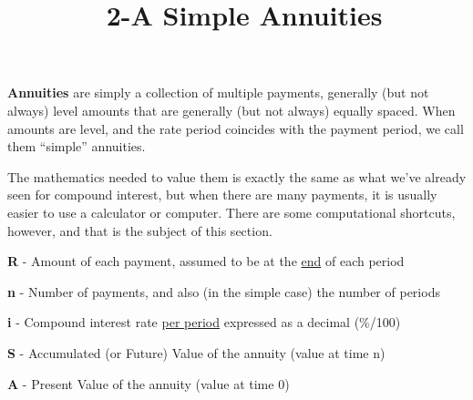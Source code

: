 \documentclass[12pt]{article}
\title{\normalfont\ 2-A Simple Annuities} %
\author{} %
\date{}  %
\begin{document}
\maketitle %

\vspace{-1.1in}

\begin{flushleft}
    \textbf{Annuities} are simply a collection of multiple payments, generally (but not always)
    level amounts that are generally (but not always) equally spaced.  When amounts are level, and
    the rate period coincides with the payment period, we call them ``simple'' annuities.
\end{flushleft}

\begin{flushleft}
    The mathematics needed to value them is exactly the same as what we've already seen for compound interest,
    but when there are many payments, it is usually easier to use a calculator or computer.  There are some
    computational shortcuts, however, and that is the subject of this section.
\end{flushleft}
\vspace{.05in}

\begin{description}
    \item \textbf{R} - Amount of each payment, assumed to be at the \underline{end} of each period
    \item\textbf{n} - Number of payments, and also (in the simple case) the number of periods
    \item\textbf{i} - Compound interest rate \underline{per period} expressed as a decimal {(\%/100)}
    \item\textbf{S} - Accumulated (or Future) Value of the annuity (value at time n)
    \item\textbf{A} - Present Value of the annuity (value at time 0)
\end{description}
\vspace{.1in}
\end{document}
